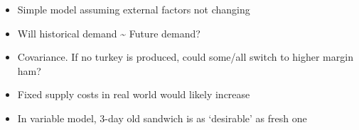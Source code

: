 \documentclass[]{article}
\begin{document}
\begin{itemize}
\itemsep1pt\parskip0pt
\item
  Simple model assuming external factors not changing
\item
  Will historical demand \textasciitilde{} Future demand?
\item
  Covariance. If no turkey is produced, could some/all switch to higher
  margin ham?
\item
  Fixed supply costs in real world would likely increase
\item
  In variable model, 3-day old sandwich is as `desirable' as fresh one
\end{itemize}
\end{document}
